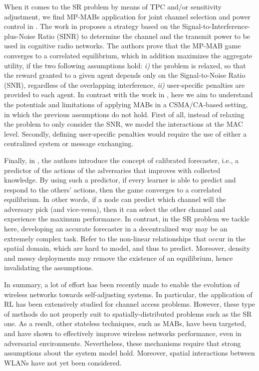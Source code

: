 \documentclass{article}
\begin{document}
When it comes to the SR problem by means of TPC and/or sensitivity adjustment, we find MP-MABs application for joint channel selection and power control in \cite{maghsudi2015joint, maghsudi2015channel}. The work in \cite{maghsudi2015joint} proposes a strategy based on the Signal-to-Interference-plus-Noise Ratio (SINR) to determine the channel and the transmit power to be used in cognitive radio networks. The authors prove that the MP-MAB game converges to a correlated equilibrium, which in addition maximizes the aggregate utility, if the two following assumptions hold: \emph{i)} the problem is relaxed, so that the reward granted to a given agent depends only on the Signal-to-Noise Ratio (SNR), regardless of the overlapping interference, \emph{ii)} user-specific penalties are provided to each agent. In contrast with the work in \cite{maghsudi2015joint}, here we aim to understand the potentials and limitations of applying MABs in a CSMA/CA-based setting, in which the previous assumptions do not hold. First of all, instead of relaxing the problem to only consider the SNR, we model the interactions at the MAC level. Secondly, defining user-specific penalties would require the use of either a centralized system or message exchanging.

Finally, in \cite{maghsudi2015channel}, the authors introduce the concept of calibrated forecaster, i.e., a predictor of the actions of the adversaries that improves with collected knowledge. By using such a predictor, if every learner is able to predict and respond to the others' actions, then the game converges to a correlated equilibrium. In other words, if a node can predict which channel will the adversary pick (and vice-versa), then it can select the other channel and experience the maximum performance. In contrast, in the SR problem we tackle here, developing an accurate forecaster in a decentralized way may be an extremely complex task. Refer to the non-linear relationships that occur in the spatial domain, which are hard to model, and thus to predict. Moreover, density and messy deployments may remove the existence of an equilibrium, hence invalidating the assumptions.

In summary, a lot of effort has been recently made to enable the evolution of wireless networks towards self-adjusting systems. In particular, the application of RL has been extensively studied for channel access problems. However, these type of methods do not properly suit to spatially-distributed problems such as the SR one. As a result, other stateless techniques, such as MABs, have been targeted, and have shown to effectively improve wireless networks performance, even in adversarial environments. Nevertheless, these mechanisms require that strong assumptions about the system model hold. Moreover, spatial interactions between WLANs have not yet been considered.
\end{document}
